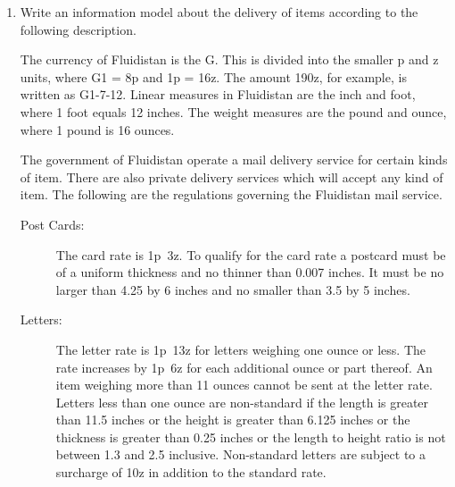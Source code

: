 \documentclass{article}
\newenvironment{exercises}{\begin{enumerate}}{\end{enumerate}}
\begin{document}
\begin{exercises}
    A University is organised into academic, research and administrative 
departments. Administrative staff may work in any kind of department, but 
neither academic staff nor research staff work in the administrative 
departments. Academic staff teach courses and may do research work. 
Research staff are limited to research work only. Administrative staff 
neither teach nor do research. All undergraduate and some graduate 
students attend courses. There is a fee for each course, the amount of 
which differs according to the course. Students are graded on each course 
they attend, with a grade having a value between 0 and 100. It is a 
tradition, however, of the University that no student has ever been 
graded at either 0 or 100. Some undergraduate students may be employed 
part-time to assist the administrative staff, but only if their grade 
is 75 or more. All staff get paid a salary, the amount of which depends
on their position. Graduate students do research. They may teach not more than
two courses, and are paid at a fixed rate per course. No person under the age
of 18 may be paid, and the retirement age is 65. 

\item \label{ex:fluid} Write an information model about the delivery of items 
according to the following description.

    The currency of Fluidistan is the G. This is divided into the 
smaller p and z units, where G1 = 8p and 1p = 16z. The amount 190z, 
for example, is written as G1-7-12. Linear measures in Fluidistan are 
the inch and foot, where 1 foot equals 12 inches. The weight measures 
are the pound and ounce, where 1 pound is 16 ounces.

    The government of Fluidistan operate a mail delivery service for 
certain kinds of item. There are also private delivery services which 
will accept any kind of item. The following are the regulations governing 
the Fluidistan mail service.
\begin{description}
\item[Post Cards:] The card rate is 1p~3z. To qualify for the card rate 
a postcard must be of a uniform thickness and no thinner than 0.007 inches. 
It must be no larger than 4.25 by 6 inches and no smaller than 3.5 by 5 inches.

\item[Letters:] The letter rate is 1p~13z for letters weighing one ounce 
or less. The rate increases by 1p~6z for each additional ounce or part 
thereof. An item weighing more than 11 ounces cannot be sent at the 
letter rate. Letters less than one ounce are non-standard if the length 
is greater than 11.5 inches or the height is greater than 6.125 inches 
or the thickness is greater than 0.25 inches or the length to height 
ratio is not between 1.3 and 2.5 inclusive. Non-standard letters are 
subject to a surcharge of 10z in addition to the standard rate.


\end{description}
\end{exercises}
\end{document}
